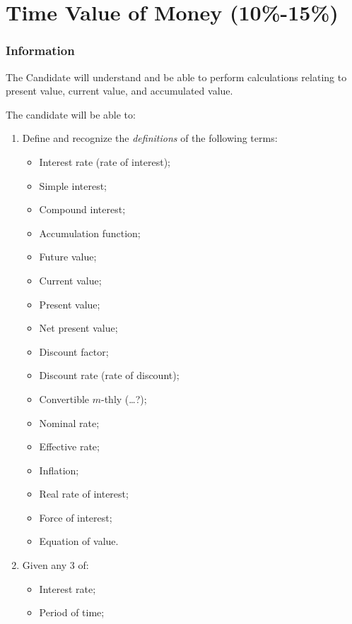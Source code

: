 \chapter[Time Value of Money]{Time Value of Money (10\%-15\%)}

\subsection{Information}

\begin{distributions}[Objective]
The Candidate will understand and be able to perform calculations relating to present value, current value, and accumulated value.
\end{distributions}

\begin{outcomes}
The candidate will be able to:
\begin{enumerate}[label = \alph*), leftmargin = *]
	\item	Define and recognize the \textit{definitions} of the following terms:
		\begin{itemize}[leftmargin = *]
		\item	Interest rate (rate of interest);
		\item	Simple interest;
		\item	Compound interest;
		\item	Accumulation function;
		\item	Future value;
		\item	Current value;
		\item	Present value;
		\item	Net present value;
		\item	Discount factor;
		\item	Discount rate (rate of discount);
		\item	Convertible $m$-thly (\dots ?);
		\item	Nominal rate;
		\item	Effective rate;
		\item	Inflation;
		\item	Real rate of interest;
		\item	Force of interest;
		\item	Equation of value.
		\end{itemize}
	\item	Given any 3 of:
		\begin{itemize}[leftmargin = *]
		\item	Interest rate;
		\item	Period of time;

\end{itemize}
\end{enumerate}
\end{outcomes}
